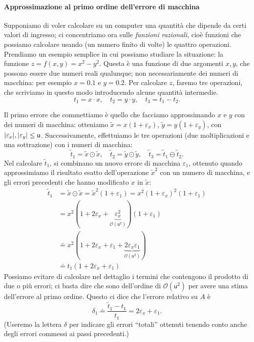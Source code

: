 \documentclass[a4paper]{report}
\DeclarePairedDelimiter{\abs}{\lvert}{\rvert}
\theoremstyle{definition}
\theoremstyle{remark}
\begin{document}
\paragraph{Approssimazione al primo ordine dell'errore di macchina} Supponiamo di voler calcolare su un computer una quantità che dipende da certi valori di ingresso; ci concentriamo ora sulle \emph{funzioni razionali}, cioè funzioni che possiamo calcolare usando (un numero finito di volte) le quattro operazioni. Prendiamo un esempio semplice in cui possiamo studiare la situazione: la funzione $z = f(x,y) = x^2 - y^2$. Questa è una funzione di due argomenti $x,y$, che possono essere due numeri reali qualunque; non necessariamente dei numeri di macchina: per esempio $x=0.1$ e $y=0.2$. Per calcolare $z$, faremo tre operazioni, che scriviamo in questo modo introducendo alcune quantità intermedie.
\[
t_1 = x \cdot x, \quad t_2 = y \cdot y, \quad t_3 = t_1 - t_2.
\]

Il primo errore che commettiamo è quello che facciamo approssimando $x$ e $y$ con dei numeri di macchina: otteniamo $\tilde{x} = x(1+\varepsilon_x)$, $\tilde{y} = y(1+\varepsilon_y)$, con $\abs{\varepsilon_x},\abs{\varepsilon_y} \leq \mathsf{u}$. Successivamente, effettuiamo le tre operazioni (due moltiplicazioni e una sottrazione) con i numeri di macchina:
\[
\tilde{t}_1 = \tilde{x} \odot \tilde{x}, \quad \tilde{t}_2 = \tilde{y} \odot \tilde{y}, \quad \tilde{t}_3 = \tilde{t}_1 \ominus \tilde{t}_2.
\]
Nel calcolare $\tilde{t}_1$, si combinano un nuovo errore di macchina $\varepsilon_1$, ottenuto quando approssimiamo il risultato esatto dell'operazione $\tilde{x}^2$ con un numero di macchina, e gli errori precedenti che hanno modificato $x$ in $\tilde{x}$:
\begin{align*}
    \tilde{t}_1 &= \tilde{x} \odot \tilde{x} = \tilde{x}^2 (1+\varepsilon_1) = x^2(1+\varepsilon_x)^2 (1+\varepsilon_1)\\
    &= x^2 (1+2\varepsilon_x + \underbrace{\varepsilon_x^2}_{\mathcal{O}(\mathsf{u}^2)})(1+\varepsilon_1)\\
    &\doteq x^2(1+2\varepsilon_x + \varepsilon_1 + \underbrace{2\varepsilon_x\varepsilon_1}_{\mathcal{O}(\mathsf{u}^2)})\\
    &\doteq t_1(1+2\varepsilon_x + \varepsilon_1)
\end{align*}
Possiamo evitare di calcolare nel dettaglio i termini che contengono il prodotto di due o più errori; ci basta dire che sono dell'ordine di $\mathcal{O}(\mathsf{u}^2)$ per avere una stima dell'errore al primo ordine. Questo ci dice che l'errore relativo su $A$ è
\[
\delta_1 \doteq \frac{\tilde{t}_1-t_1}{t_1} = 2\varepsilon_x + \varepsilon_1.
\]
(Useremo la lettera $\delta$ per indicare gli errori ``totali'' ottenuti tenendo conto anche degli errori commessi ai passi precedenti.)
\end{document}
